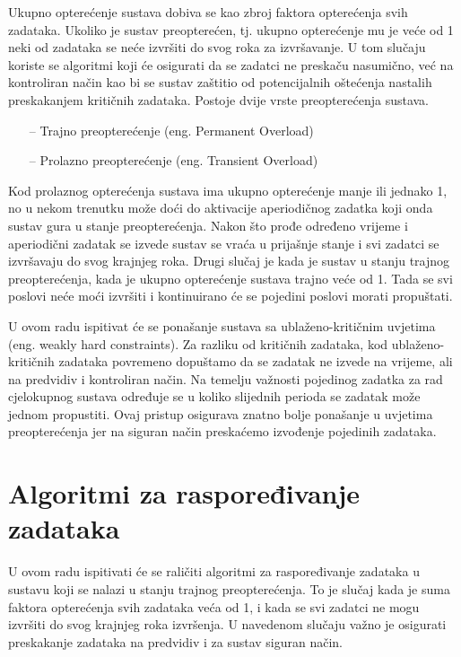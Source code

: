 \documentclass[../zavrsni.tex]{subfiles}
\begin{document}
Ukupno opterećenje sustava dobiva se kao zbroj faktora opterećenja svih zadataka. Ukoliko je sustav preopterećen, tj. ukupno opterećenje mu 
je veće od 1 neki od zadataka se neće izvršiti do svog roka za izvršavanje. U tom slučaju koriste se algoritmi koji će osigurati 
da se zadatci ne preskaču nasumično, već na kontroliran način kao bi se sustav zaštitio od potencijalnih oštećenja nastalih preskakanjem 
kritičnih zadataka. Postoje dvije vrste preopterećenja sustava.
\begin{itemize}
    \item[--] Trajno preopterećenje (eng. Permanent Overload)
    \item[--] Prolazno preopterećenje (eng. Transient Overload)
\end{itemize}
Kod prolaznog opterećenja sustava ima ukupno opterećenje manje ili jednako 1, no u nekom trenutku može doći do aktivacije aperiodičnog zadatka 
koji onda sustav gura u stanje preopterećenja. Nakon što prođe određeno vrijeme i aperiodični zadatak se izvede sustav se vraća u prijašnje
stanje i svi zadatci se izvršavaju do svog krajnjeg roka. Drugi slučaj je kada je sustav u stanju trajnog preopterećenja, kada je ukupno 
opterećenje sustava trajno veće od 1. Tada se svi poslovi neće moći izvršiti i kontinuirano će se pojedini poslovi morati propuštati. 


U ovom radu ispitivat će se ponašanje sustava sa ublaženo-kritičnim uvjetima (eng. weakly hard constraints). Za razliku od 
kritičnih zadataka, kod ublaženo-kritičnih zadataka povremeno dopuštamo da se zadatak ne izvede na vrijeme, ali na predvidiv i 
kontroliran način. Na temelju važnosti pojedinog zadatka za rad cjelokupnog sustava određuje se u koliko slijednih perioda 
se zadatak može jednom propustiti. Ovaj pristup osigurava znatno bolje ponašanje u uvjetima preopterećenja jer na siguran 
način preskaćemo izvođenje pojedinih zadataka.

\section{Algoritmi za raspoređivanje zadataka}

U ovom radu ispitivati će se raličiti algoritmi za raspoređivanje zadataka u sustavu koji se nalazi u stanju trajnog preopterećenja.
To je slučaj kada je suma faktora opterećenja svih zadataka veća od 1, i kada se svi zadatci ne mogu izvršiti do svog krajnjeg roka 
izvršenja. U navedenom slučaju važno je osigurati preskakanje zadataka na predvidiv i za sustav siguran način.
\end{document}
